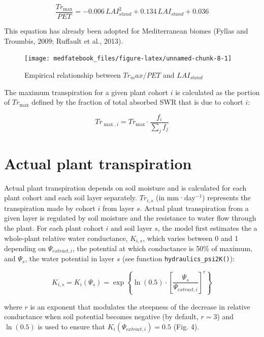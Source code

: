 \documentclass[]{book}
\begin{document}
\begin{equation}
\frac{Tr_{\max}}{PET}= -0.006\,LAI_{stand}^2+0.134\,LAI_{stand}+0.036
\end{equation}

This equation has already been adopted for Mediterranean biomes (Fyllas
and Troumbis, 2009; Ruffault et al., 2013).

\begin{figure}

{\centering \texttt{[image: medfatebook\_files/figure-latex/unnamed-chunk-8-1]} 

}

\caption{Empirical relationship between $Tr_max/PET$ and $LAI_{stand}$}\label{fig:unnamed-chunk-8}
\end{figure}

The maximum transpiration for a given plant cohort \(i\) is calculated
as the portion of \(Tr_{\max}\) defined by the fraction of total
absorbed SWR that is due to cohort \(i\):

\begin{equation}
Tr_{\max, i} = Tr_{\max} \cdot \frac{f_i}{\sum_{j}{f_j}}
\end{equation}

\section{Actual plant transpiration}\label{actual-plant-transpiration}

Actual plant transpiration depends on soil moisture and is calculated
for each plant cohort and each soil layer separately. \(Tr_{i,s}\) (in
mm·day\(^{-1}\)) represents the transpiration made by cohort \(i\) from
layer \(s\). Actual plant transpiration from a given layer is regulated
by soil moisture and the resistance to water flow through the plant. For
each plant cohort \(i\) and soil layer \(s\), the model first estimates
the a whole-plant relative water conductance, \(K_{i,s}\), which varies
between 0 and 1 depending on \(\Psi_{extract,i}\), the potential at
which conductance is 50\% of maximum, and \(\Psi_s\), the water
potential in layer \(s\) (see function \texttt{hydraulics\_psi2K()}):

\begin{equation}
K_{i,s}=K_{i}(\Psi_s) = \exp \left \{\ln{(0.5)}\cdot \left[ \frac{\Psi_s}{\Psi_{extract,i}} \right] ^r \right \} 
\end{equation}

where \(r\) is an exponent that modulates the steepness of the decrease
in relative conductance when soil potential becomes negative (by
default, \(r = 3\)) and \(\ln(0.5)\) is used to ensure that
\(K_{i}(\Psi_{extract,i}) = 0.5\) (Fig. 4).
\end{document}
